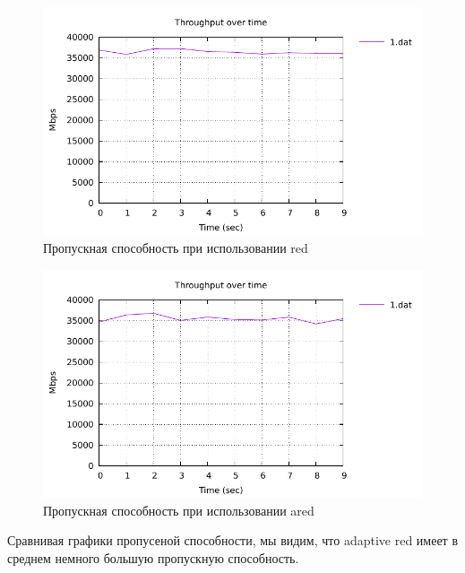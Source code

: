 \begin{figure}[!ht]
  \centering
  \includegraphics[width=0.6\linewidth]{image/mininet_red/throughput.pdf}
  \caption{Пропускная способность при использовании red}
  \label{fig:3.17}
\end{figure}

\begin{figure}[!ht]
  \centering
  \includegraphics[width=0.6\linewidth]{image/mininet_ared/throughput.pdf}
  \caption{Пропускная способность при использовании ared}
  \label{fig:3.18}
\end{figure}

Сравнивая графики пропусеной способности, мы видим, что  adaptive red имеет в среднем немного большую пропускную способность. 




